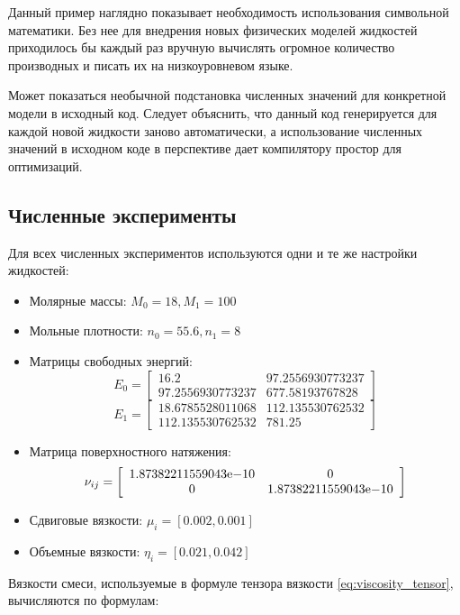Данный пример наглядно показывает необходимость использования символьной математики. Без нее для внедрения новых физических моделей жидкостей приходилось бы каждый раз вручную вычислять огромное количество производных и писать их на низкоуровневом языке. 
\par
Может показаться необычной подстановка численных значений для конкретной модели в исходный код. Следует объяснить, что данный код генерируется для каждой новой жидкости заново автоматически, а использование численных значений в исходном коде в перспективе дает компилятору простор для оптимизаций.
\subsection{Численные эксперименты}
Для всех численных экспериментов используются одни и те же настройки жидкостей:
\begin{itemize}
\item Молярные массы: $M_0 = 18, M_1 = 100$
\item Мольные плотности: $n_0 = 55.6, n_1 = 8$
\item Матрицы свободных энергий: \begin{equation}
E_0 = \left[
\begin{array}{cc}
16.2 & 97.2556930773237 \\
		97.2556930773237 & 677.58193767828
\end{array}
\right]
\end{equation}\begin{equation}
E_1 = \left[
\begin{array}{cc}
	18.6785528011068 & 112.135530762532 \\
	112.135530762532 & 781.25
\end{array}
\right]
\end{equation}
\item Матрица поверхностного натяжения: \begin{equation} \nu_{ij} =\left[
\begin{array}{cc}
{1.87382211559043}\mathrm{e}{-10} & 0 \\
		0 & {1.87382211559043}\mathrm{e}{-10}
\end{array}
\right] \end{equation}
\item Сдвиговые вязкости: $\mu_i  = \left[ 0.002, 0.001 \right]$
\item Объемные вязкости: $\eta_i = \left[ 0.021, 0.042 \right]$
\end{itemize}
Вязкости смеси, используемые в формуле тензора вязкости \eqref{eq:viscosity_tensor}, вычисляются по формулам:
